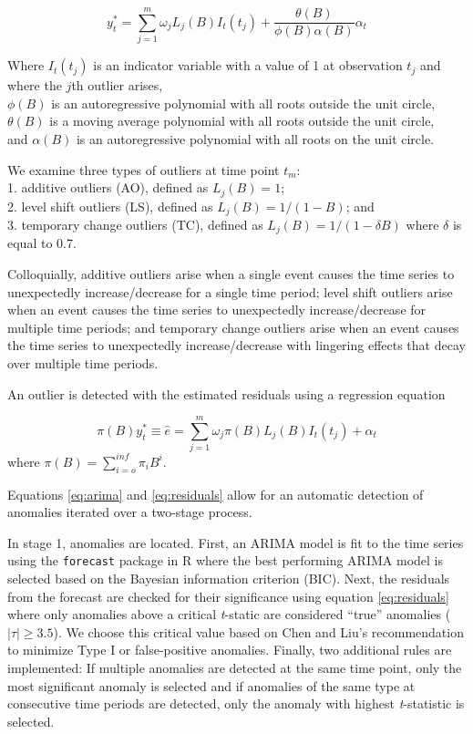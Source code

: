 \documentclass[12pt]{article}
\begin{document}
\begin{equation}
\label{eq:arima}
y_t^* = \sum_{j=1}^{m} \omega_jL_j(B)I_t(t_j) + \frac{\theta(B)}{\phi(B)\alpha(B)}\alpha_t 
\end{equation}

Where \(I_t(t_j)\) is an indicator variable with a value of 1 at
observation \(t_j\) and where the \(j\)th outlier arises,\\
\(\phi(B)\) is an autoregressive polynomial with all roots outside the
unit circle,\\
\(\theta(B)\) is a moving average polynomial with all roots outside the
unit circle,\\
and \(\alpha(B)\) is an autoregressive polynomial with all roots on the
unit circle.

We examine three types of outliers at time point \(t_m\):\\
1. additive outliers (AO), defined as \(L_j(B)=1\);\\
2. level shift outliers (LS), defined as \(L_j(B) = 1/(1-B)\); and\\
3. temporary change outliers (TC), defined as
\(L_j(B) = 1/(1-\delta B)\) where \(\delta\) is equal to 0.7.

Colloquially, additive outliers arise when a single event causes the
time series to unexpectedly increase/decrease for a single time period;
level shift outliers arise when an event causes the time series to
unexpectedly increase/decrease for multiple time periods; and temporary
change outliers arise when an event causes the time series to
unexpectedly increase/decrease with lingering effects that decay over
multiple time periods.

An outlier is detected with the estimated residuals using a regression
equation

\begin{equation}
\label{eq:residuals}
\pi(B)y_t^* \equiv \hat{e} = \sum_{j=1}^m \omega_j \pi(B)L_j(B)I_t(t_j) + \alpha_t
\end{equation} where \(\pi(B)=\sum_{i=o}^{inf} \pi_iB^i\).

Equations \ref{eq:arima} and \ref{eq:residuals} allow for an automatic
detection of anomalies iterated over a two-stage process.

In stage 1, anomalies are located. First, an ARIMA model is fit to the
time series using the \texttt{forecast} package in R
\citep{Rforecast, hymdman2008} where the best performing ARIMA model is
selected based on the Bayesian information criterion (BIC). Next, the
residuals from the forecast are checked for their significance using
equation \ref{eq:residuals} where only anomalies above a critical
\emph{t}-static are considered ``true'' anomalies (\(|\tau| \geq 3.5\)).
We choose this critical value based on Chen and Liu's
\citeyearpar{chen1993joint} recommendation to minimize Type I or
false-positive anomalies. Finally, two additional rules are implemented:
If multiple anomalies are detected at the same time point, only the most
significant anomaly is selected and if anomalies of the same type at
consecutive time periods are detected, only the anomaly with highest
\emph{t}-statistic is selected.
\end{document}
